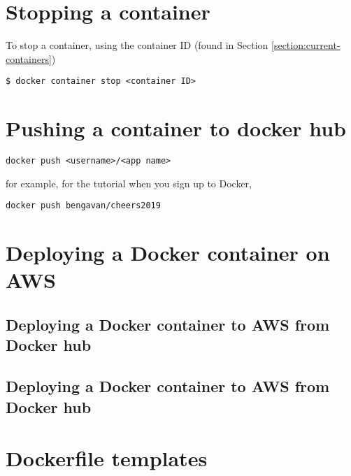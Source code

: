\documentclass[]{article}
\newcommand{\<}{\guilsinglleft}
\renewcommand{\>}{\guilsinglright}
\begin{document}
\section{Stopping a container}
To stop a container, using the container ID (found in Section \ref{section:current-containers})
\begin{lstlisting}
$ docker container stop <container ID>
\end{lstlisting}

\section{Pushing a container to docker hub}
\begin{lstlisting}
docker push <username>/<app name>
\end{lstlisting}
for example, for the tutorial when you sign up to Docker, 
\begin{lstlisting}
docker push bengavan/cheers2019
\end{lstlisting}


\section{Deploying a Docker container on AWS}

\subsection{Deploying a Docker container to AWS from Docker hub}

\subsection{Deploying a Docker container to AWS from Docker hub}

\section{Dockerfile templates}
\end{document}
